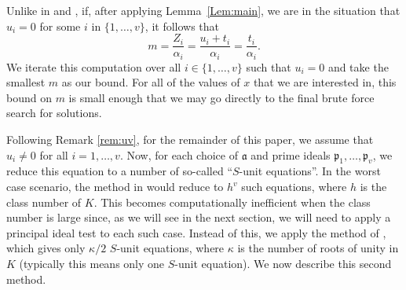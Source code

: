 {%
\begin{remark}\label{rem:uv}
Unlike in \cite{TW3} and \cite{GhKaMaSi}, if, after applying Lemma~\ref{Lem:main}, we are in the situation that $u_i = 0$ for some $i$ in $\{1, \dots, v\}$, it follows that
\[m = \frac{Z_i}{\alpha_i } =  \frac{u_i + t_i}{\alpha_i } = \frac{t_i}{\alpha_i }.\]
We iterate this computation over all $i \in \{1, \dots, v\}$ such that $u_i = 0$ and take the smallest $m$ as our bound. For all of the values of $x$ that we are interested in, this bound on $m$ is small enough that we may go directly to the final brute force search for solutions.
\end{remark}


Following Remark \ref{rem:uv}, for the remainder of this paper, we assume that $u_i \neq 0$ for all $i = 1, \dots, v$. Now, for each choice of $\mathfrak{a}$ and prime ideals $\mathfrak{p}_1, \dots, \mathfrak{p}_v$, we reduce this equation to a number of so-called ``$S$-unit equations''. In the worst case scenario, the method in \cite{TW3} would reduce to $h^v$ such equations, where $h$ is the class number of $K$. This becomes computationally inefficient when the class number is large since, as we will see in the next section, we will need to apply a principal ideal test to each such case. Instead of this, we apply the method of \cite{GhKaMaSi}, which gives only $\kappa/2$ $S$-unit equations, where $\kappa$ is the number of roots of unity in $K$ (typically this means only one $S$-unit equation). We now describe this second method. 

}
